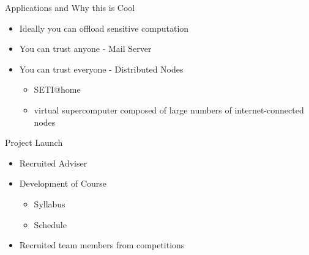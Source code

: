 \documentclass[dvips,11pt]{beamer}
\begin{document}
\begin{frame}{Applications and Why this is Cool}
  \begin{itemize}
  \item Ideally you can offload sensitive computation
  \item You can trust anyone - Mail Server
  \item You can trust everyone - Distributed Nodes
    \begin{itemize}
    \item SETI@home 
    \item virtual supercomputer composed of large numbers of internet-connected nodes
    \end{itemize}
    
  \end{itemize}
  \begin{center} 
  \end{center}
  
\end{frame}



\begin{frame}{Project Launch}
  \begin{itemize}
  \item Recruited Adviser
  \item Development of Course
    \begin{itemize}
    \item Syllabus
    \item Schedule
    \end{itemize}
  \item Recruited team members from competitions
  \end{itemize}
\end{frame}
  
\end{document}
